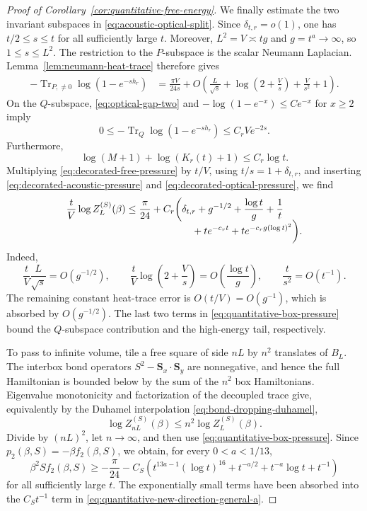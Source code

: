 \documentclass[11pt]{article}
\numberwithin{equation}{section}
\theoremstyle{remark}
\newcommand{\Tr}{\operatorname{Tr}}
\newcommand{\1}{\mathbf 1}
\newcommand{\Sp}{\mathbf S}
\begin{document}
\begin{proof}[Proof of Corollary~\ref{cor:quantitative-free-energy}]
We finally estimate the two invariant subspaces in
\eqref{eq:acoustic-optical-split}.  Since
\(\delta_{t,r}=o(1)\), one has \(t/2\leq s\leq t\) for all sufficiently
large \(t\).  Moreover, \(L^2=V\asymp tg\) and \(g=t^a\to\infty\), so
\(1\leq s\leq L^2\).  The restriction to the \(P\)-subspace is the scalar
Neumann Laplacian.
Lemma~\ref{lem:neumann-heat-trace} therefore gives
\begin{align}
 -\Tr_{P,\ne0}\log(1-e^{-sh_r})
 &=\frac{\pi V}{24s}
 +O\left(\frac{L}{\sqrt s}
 +\log\!\left(2+\frac Vs\right)+\frac{V}{s^2}+1\right).
 \label{eq:decorated-acoustic-pressure}
\end{align}
On the \(Q\)-subspace, \eqref{eq:optical-gap-two} and
\(-\log(1-e^{-x})\leq Ce^{-x}\) for \(x\geq2\) imply
\begin{equation}
 0\leq-\Tr_Q\log(1-e^{-sh_r})\leq C_rVe^{-2s}.
 \label{eq:decorated-optical-pressure}
\end{equation}
Furthermore,
\[
 \log(M+1)+\log(K_r(t)+1)\leq C_r\log t.
\]
Multiplying \eqref{eq:decorated-free-pressure} by \(t/V\), using
\(t/s=1+\delta_{t,r}\), and inserting
\eqref{eq:decorated-acoustic-pressure} and
\eqref{eq:decorated-optical-pressure}, we find
\begin{align}
 \frac{t}{V}\log Z_L^{(S)}(\beta)
 \leq\frac{\pi}{24}
 +C_r\bigg(&\delta_{t,r}+g^{-1/2}
 +\frac{\log t}{g}+\frac1t\notag\\[-2mm]
 &\quad+te^{-c_rt}+te^{-c_rg(\log t)^2}\bigg).
 \label{eq:quantitative-box-pressure}
\end{align}
Indeed,
\[
 \frac{t}{V}\frac{L}{\sqrt s}=O(g^{-1/2}),\qquad
 \frac{t}{V}\log\!\left(2+\frac Vs\right)
 =O\!\left(\frac{\log t}{g}\right),\qquad
 \frac{t}{s^2}=O(t^{-1}).
\]
The remaining constant heat-trace error is \(O(t/V)=O(g^{-1})\), which
is absorbed by \(O(g^{-1/2})\).  The last two terms in
\eqref{eq:quantitative-box-pressure} bound the \(Q\)-subspace contribution
and the high-energy tail, respectively.

To pass to infinite volume, tile a free square of side \(nL\) by
\(n^2\) translates of \(B_L\).  The interbox bond operators
\(S^2-\Sp_x\cdot\Sp_y\) are nonnegative, and hence the full Hamiltonian is
bounded below by the sum of the \(n^2\) box Hamiltonians.  Eigenvalue
monotonicity and factorization of the decoupled trace give, equivalently by
the Duhamel interpolation \eqref{eq:bond-dropping-duhamel},
\[
 \log Z_{nL}^{(S)}(\beta)\leq n^2\log Z_L^{(S)}(\beta).
\]
Divide by \((nL)^2\), let \(n\to\infty\), and then use
\eqref{eq:quantitative-box-pressure}.  Since
\(p_2(\beta,S)=-\beta f_2(\beta,S)\), we obtain, for every
\(0<a<1/13\),
\begin{equation}
 \beta^2S f_2(\beta,S)
 \geq-\frac{\pi}{24}
 -C_S\left(t^{13a-1}(\log t)^{16}
              +t^{-a/2}+t^{-a}\log t+t^{-1}\right)
 \label{eq:quantitative-new-direction-general-a}
\end{equation}
for all sufficiently large \(t\).  The exponentially small terms have
been absorbed into the \(C_St^{-1}\) term in
\eqref{eq:quantitative-new-direction-general-a}.


\end{proof}
\end{document}
